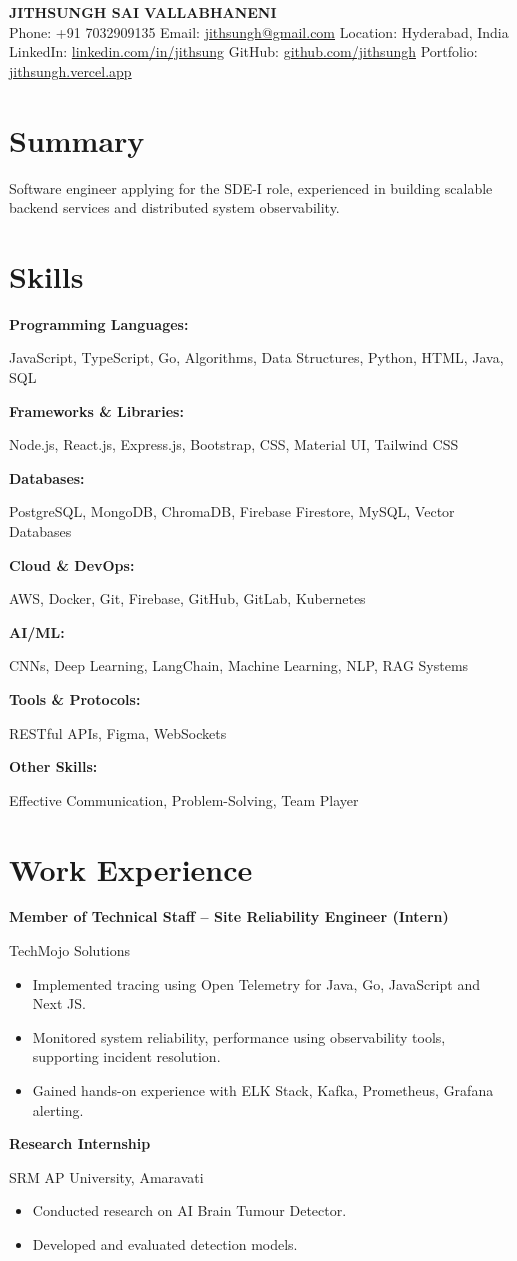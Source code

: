 \documentclass[a4paper,10pt]{article}
\newcommand{\tworow}[2]{%
  \noindent%
  \begin{minipage}[t]{0.615\textwidth}\raggedright #1\end{minipage}%
  \hfill%
  \begin{minipage}[t]{0.365\textwidth}\raggedleft #2\end{minipage}%
  \par%
}
\newcommand{\resumeheader}[3]{%
  \begin{center}
    {\LARGE \textbf{#1}} \\[0.5em]
    \small #2 \\[0.3em]
    \small #3
  \end{center}
}
\newcommand{\expentry}[3]{%
  \tworow{\textbf{#1}}{#2}%
  \ifx\relax#3\relax\else\textit{\small #3}\par\fi
}
\newenvironment{rbullets}{%
  \vspace{0.12em}%
  \begin{itemize}[leftmargin=1.1em, labelsep=0.4em, label=\textbullet,
                  itemsep=0.12em, topsep=0.08em, parsep=0pt, partopsep=0pt]%
}{%
  \end{itemize}%
}
\newcommand{\entrygap}{\vspace{0.55em}}
\newcommand{\skillrow}[2]{%
  \noindent%
  \begin{minipage}[t]{0.27\textwidth}\raggedright\textbf{#1}\end{minipage}%
  \begin{minipage}[t]{0.73\textwidth}\raggedright #2\end{minipage}%
  \par\vspace{0.18em}%
}
\begin{document}
\resumeheader{JITHSUNGH SAI VALLABHANENI}{%
  Phone: +91 7032909135 \quad  Email: \href{mailto:jithsungh@gmail.com}{jithsungh@gmail.com} \quad  Location: Hyderabad, India }{%
  LinkedIn: \href{https://linkedin.com/in/jithsung}{linkedin.com/in/jithsung} \quad  GitHub: \href{https://github.com/jithsungh}{github.com/jithsungh} \quad  Portfolio: \href{https://jithsungh.vercel.app}{jithsungh.vercel.app} }

\section*{Summary}
Software engineer applying for the SDE-I role, experienced in building scalable backend services and distributed system observability.

\section*{Skills}
\skillrow{Programming Languages:}{JavaScript, TypeScript, Go, Algorithms, Data Structures, Python, HTML, Java, SQL}
\skillrow{Frameworks \& Libraries:}{Node.js, React.js, Express.js, Bootstrap, CSS, Material UI, Tailwind CSS}
\skillrow{Databases:}{PostgreSQL, MongoDB, ChromaDB, Firebase Firestore, MySQL, Vector Databases}
\skillrow{Cloud \& DevOps:}{AWS, Docker, Git, Firebase, GitHub, GitLab, Kubernetes}
\skillrow{AI/ML:}{CNNs, Deep Learning, LangChain, Machine Learning, NLP, RAG Systems}
\skillrow{Tools \& Protocols:}{RESTful APIs, Figma, WebSockets}
\skillrow{Other Skills:}{Effective Communication, Problem-Solving, Team Player}

\section*{Work Experience}
\expentry{Member of Technical Staff -- Site Reliability Engineer (Intern)}{TechMojo Solutions}{}
\begin{rbullets}
  \item Implemented tracing using Open Telemetry for Java, Go, JavaScript and Next JS.
  \item Monitored system reliability, performance using observability tools, supporting incident resolution.
  \item Gained hands-on experience with ELK Stack, Kafka, Prometheus, Grafana alerting.
\end{rbullets}
\entrygap
\expentry{Research Internship}{SRM AP University, Amaravati}{}
\begin{rbullets}
  \item Conducted research on AI Brain Tumour Detector.
  \item Developed and evaluated detection models.
\end{rbullets}
\end{document}
